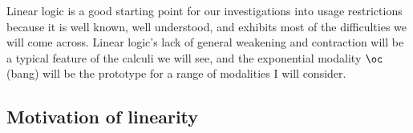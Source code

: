 Linear logic is a good starting point for our investigations into usage
restrictions because it is well known, well understood, and exhibits most of the
difficulties we will come across.
Linear logic's lack of general weakening and contraction will be a typical
feature of the calculi we will see, and the exponential modality $\oc$ (bang)
will be the prototype for a range of modalities I will consider.

\subsection{Motivation of linearity}

%
%
%
%
%
%
%
%
%
%
%
%
